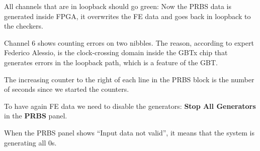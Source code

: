 \begin{leftbar}
    All channels that are in loopback should go green: Now the PRBS data is
    generated inside FPGA, it overwrites the FE data and goes back in loopback
    to the checkers.
\end{leftbar}

\begin{leftbar}
    Channel 6  shows counting errors on two nibbles.
    The reason, according to expert Federico Alessio, is the clock-crossing
    domain inside the GBTx chip that generates errors in the loopback path,
    which is a feature of the GBT.
\end{leftbar}

\begin{leftbar}
    The increasing counter to the right of each line in the PRBS block is the
    number of seconds since we started the counters.
\end{leftbar}

\begin{leftbar}
    To have again FE data we need to disable the generators:
    \textbf{Stop All Generators} in the \textbf{PRBS} panel.
\end{leftbar}

\begin{leftbar}
    When the PRBS panel shows ``Input data not valid'', it means that the
    system is generating all 0s.
\end{leftbar}
